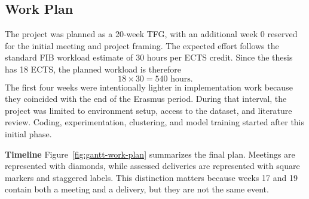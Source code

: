 \documentclass[11pt,a4paper,chapterprefix=false,parskip=false]{scrreprt}
\begin{document}
\begin{appendices}
    \chapter{Work Plan}
    \label{app:work-plan}
    The project was planned as a 20-week TFG, with an additional week 0 reserved for the initial meeting and project framing. The expected effort follows the standard FIB workload estimate of 30 hours per ECTS credit. Since the thesis has 18 ECTS, the planned workload is therefore
    \[
        18 \times 30 = 540 \text{ hours}.
    \]
    The first four weeks were intentionally lighter in implementation work because they coincided with the end of the Erasmus period. During that interval, the project was limited to environment setup, access to the dataset, and literature review. Coding, experimentation, clustering, and model training started after this initial phase.

    \textbf{Timeline}
    Figure~\ref{fig:gantt-work-plan} summarizes the final plan. Meetings are represented with diamonds, while assessed deliveries are represented with square markers and staggered labels. This distinction matters because weeks 17 and 19 contain both a meeting and a delivery, but they are not the same event.

    \begin{figure}[H]
        \centering
\end{figure}
\end{appendices}
\end{document}
